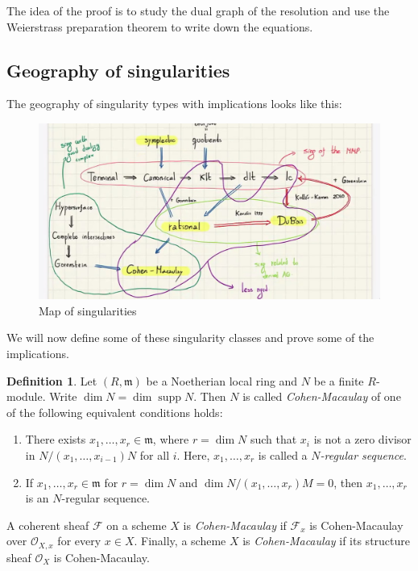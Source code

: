\documentclass[leqno, openany]{memoir}
\theoremstyle{definition}
\newtheorem{defn}[thm]{Definition}
\theoremstyle{remark}
\theoremstyle{plain}
\theoremstyle{definition}
\theoremstyle{remark}
\newcommand{\msc}[1]{\mathscr{#1}}
\newcommand{\mf}[1]{\mathfrak{#1}}
\DeclareMathOperator{\supp}{supp}
\begin{document}
The idea of the proof is to study the dual graph of the resolution and use the Weierstrass preparation theorem to write down the equations.

\subsection{Geography of singularities}%
\label{sub:geography_of_singularities}

The geography of singularity types with implications looks like this:
\begin{figure}[H]
    \centering
    \includegraphics[width=0.8\linewidth]{sing}
    \caption{Map of singularities}%
    \label{fig:sing}
\end{figure}

We will now define some of these singularity classes and prove some of the implications.

\begin{defn}
    Let $(R, \mf{m})$ be a Noetherian local ring and $N$ be a finite $R$-module. Write $\dim N = \dim \supp N$. Then $N$ is called \textit{Cohen-Macaulay} of one of the following equivalent conditions holds:
    \begin{enumerate}
        \item There exists $x_1, \ldots, x_r \in \mf{m}$, where $r = \dim N$ such that $x_i$ is not a zero divisor in $N/(x_1, \ldots, x_{i-1})N$ for all $i$. Here, $x_1, \ldots, x_r$ is called a \textit{$N$-regular sequence}.
        \item If $x_1, \ldots, x_r \in \mf{m}$ for $r = \dim N$ and $\dim N/(x_1, \ldots, x_r)M = 0$, then $x_1, \ldots, x_r$ is an $N$-regular sequence.
    \end{enumerate}
    A coherent sheaf $\msc{F}$ on a scheme $X$ is \textit{Cohen-Macaulay} if $\msc{F}_x$ is Cohen-Macaulay over $\msc{O}_{X,x}$ for every $x \in X$. Finally, a scheme $X$ is \textit{Cohen-Macaulay} if its structure sheaf $\msc{O}_X$ is Cohen-Macaulay.
\end{defn}
\end{document}
